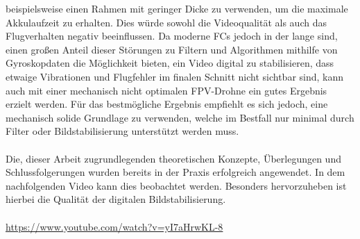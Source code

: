 beispielsweise einen Rahmen mit geringer Dicke zu verwenden, um die maximale Akkulaufzeit zu erhalten.
Dies würde sowohl die Videoqualität als auch das Flugverhalten negativ beeinflussen. Da moderne FCs
jedoch in der lange sind, einen großen Anteil dieser Störungen zu Filtern und Algorithmen mithilfe
von Gyroskopdaten die Möglichkeit bieten, ein Video digital zu stabilisieren, dass etwaige Vibrationen
und Flugfehler im finalen Schnitt nicht sichtbar sind, kann auch mit einer mechanisch nicht optimalen
FPV-Drohne ein gutes Ergebnis erzielt werden. Für das bestmögliche Ergebnis empfiehlt es sich jedoch,
eine mechanisch solide Grundlage zu verwenden, welche im Bestfall nur minimal durch Filter oder 
Bildstabilisierung unterstützt werden muss. \\
\\
Die, dieser Arbeit zugrundlegenden theoretischen Konzepte, Überlegungen und Schlussfolgerungen
wurden bereits in der Praxis erfolgreich angewendet. In dem nachfolgenden Video kann dies beobachtet
werden. Besonders hervorzuheben ist hierbei die Qualität der digitalen Bildstabilisierung. \\
\\
\href{https://www.youtube.com/watch?v=yI7aHrwKL-8}{https://www.youtube.com/watch?v=yI7aHrwKL-8}
